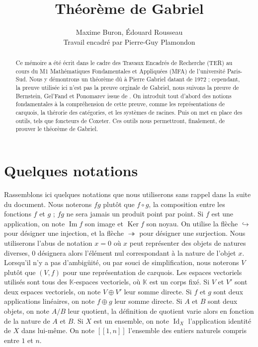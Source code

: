 \documentclass[a4paper,11pt]{article}
\title{Théorème de Gabriel}
\author{Maxime Buron, Édouard Rousseau\\
Travail encadré par Pierre-Guy Plamondon}
\DeclareMathOperator{\Ker}{Ker}
\DeclareMathOperator{\Id}{Id}
\DeclareMathOperator{\Img}{Im}
\begin{document}
\maketitle

\begin{abstract} 
	Ce mémoire a été écrit dans le cadre des Travaux Encadrés de Recherche (TER) au cours du M1 Mathématiques Fondamentales et Appliquées (MFA) de l'université Paris-Sud. Nous y démontrons un théorème dû à Pierre Gabriel datant de 1972 ; cependant, la preuve utilisée ici n'est pas la preuve orginale de Gabriel, nous suivons la preuve de Bernstein, Gel'Fand et Ponomarev issue de \cite{BGP72}. On introduit tout d'abord des notions fondamentales à la compréhension de cette preuve, comme les représentations de carquois, la thérorie des catégories, et les systèmes de racines. Puis on met en place des outils, tels que foncteurs de Coxeter. Ces outils nous permettront, finalement, de prouver le théorème de Gabriel.
\end{abstract}

\tableofcontents

\clearpage
\section*{Quelques notations}
Rassemblons ici quelques notations que nous utiliserons sans rappel dans la suite du document. Nous noterons $fg$ plutôt que $f\circ g$, la composition entre les fonctions $f$ et $g$ ; $fg$ ne sera jamais un produit point par point. Si $f$ est une application, on note $\Img f$ son image et $\Ker f$ son noyau. On utilise la flèche $\hookrightarrow$ pour désigner une injection, et la flèche $\twoheadrightarrow$ pour désigner une surjection. Nous utiliserons l'abus de notation $x=0$ où $x$ peut représenter des objets de natures diverses, $0$ désignera alors l'élément nul correspondant à la nature de l'objet $x$. Lorsqu'il n'y a pas d'ambigüité, ou par souci de simplification, nous noterons $V$ plutôt que $(V,f)$ pour une représentation de carquois. Les espaces vectoriels utilisés sont tous des $\mathbb K$-espaces vectoriels, où $\mathbb K$ est un corps fixé. Si $V$ et $V'$ sont deux espaces vectoriels, on note $V\oplus V'$ leur somme directe. Si $f$ et $g$ sont deux applications linéaires, on note $f\oplus g$ leur somme directe. Si $A$ et $B$ sont deux objets, on note $A/B$ leur quotient, la définition de quotient varie alors en fonction de la nature de $A$ et $B$. Si $X$ est un ensemble, on note $\Id_X$ l'application identité de $X$ dans lui-même.  On note $[\![1,n]\!]$ l'ensemble des entiers naturels compris entre $1$ et $n$. 
        
\end{document}
